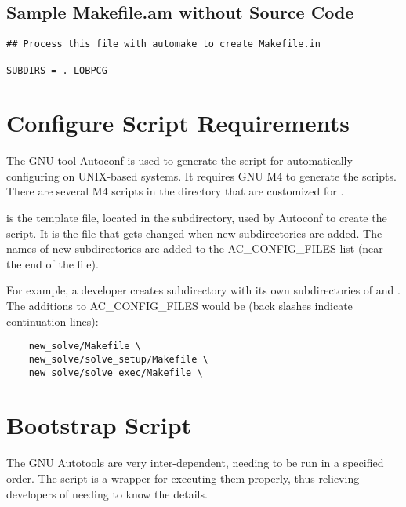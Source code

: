 \subsection{Sample Makefile.am without Source Code}
\label{Sample Makefile.am without Source Code}

\begin{verbatim}
## Process this file with automake to create Makefile.in

SUBDIRS = . LOBPCG

\end{verbatim}

\section{Configure Script Requirements}
\label{Configure Script Requirements}


The GNU tool Autoconf is used to generate the  script for automatically
configuring \hypre{} on UNIX-based systems.  It requires GNU M4 to generate the
scripts.  There are several M4 scripts in the  directory
that are customized for \hypre{}.

 is the template file, located in the  subdirectory, used 
by Autoconf to create the  script.  It is the file that gets changed
when new subdirectories are added.  The names of new subdirectories are added to
the AC\_CONFIG\_FILES list (near the end of the file).

For example, a developer creates subdirectory  with its own 
subdirectories of  and .  The additions to 
AC\_CONFIG\_FILES would be (back slashes indicate continuation lines):

\begin{verbatim}
    new_solve/Makefile \
    new_solve/solve_setup/Makefile \
    new_solve/solve_exec/Makefile \

\end{verbatim}

\section{Bootstrap Script}
\label{Bootstrap Script}


The GNU Autotools are very inter-dependent, needing to be run in a specified 
order.  The  script is a wrapper for executing them properly, 
thus relieving developers of needing to know the details.

